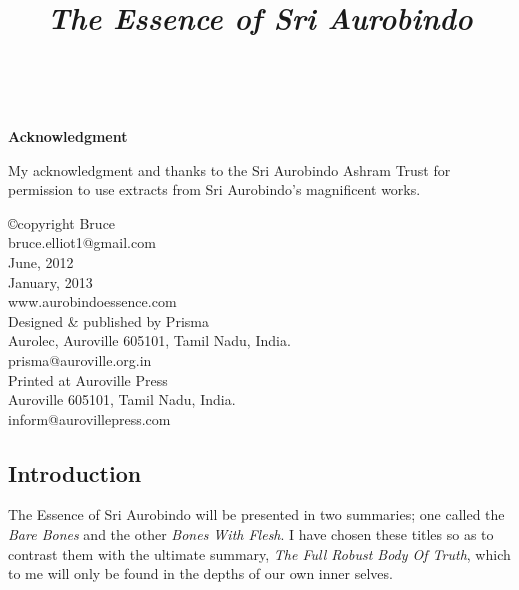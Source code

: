 \documentclass[12pt,a4paper]{book}
\title{
  {\emph{The Essence of Sri Aurobindo}}}
\date{}
\begin{document}

\Large
\thispagestyle{empty}
\maketitle


\
\vspace{2cm}
\begin{center}{\bf Acknowledgment}\end{center}
\thispagestyle{empty}

My acknowledgment and thanks to the Sri Aurobindo Ashram Trust for
permission to use extracts from Sri Aurobindo's magnificent works.

\vspace{0.5cm}

\begin{center}
\copyright copyright Bruce\\
bruce.elliot1@gmail.com\\
June, 2012\\
January, 2013\\
\vspace{1cm}
www.aurobindoessence.com\\
\vspace{2cm}
Designed \& published by Prisma\\
Aurolec, Auroville 605101, Tamil Nadu, India.\\
prisma@auroville.org.in\\
\vspace{0.5cm}
Printed at Auroville Press\\
Auroville 605101, Tamil Nadu, India.\\
inform@aurovillepress.com\\
\end{center}
\newpage

\pagestyle{plain}
\begin{center}\section*{Introduction}\end{center}

The Essence of Sri Aurobindo will be presented in two summaries; one
called the \emph{Bare Bones} and the other \emph{Bones With Flesh}. I
have chosen these titles so as to contrast them with the ultimate
summary, \emph{The Full Robust Body Of Truth}, which to me will only
be found in the depths of our own inner selves.
\end{document}
